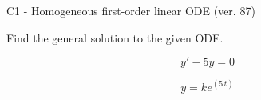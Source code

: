 \begin{exercise}
  \begin{exerciseTitle}C1 - Homogeneous first-order linear ODE (ver. 87)\end{exerciseTitle}
  \begin{exerciseStatement}
    
Find the general solution to the given ODE.

    
\[y'-5y=0\]

  \end{exerciseStatement}
  \begin{exerciseAnswer}
    
\[y= k e^{\left(5 \, t\right)}\]

  \end{exerciseAnswer}
\end{exercise}